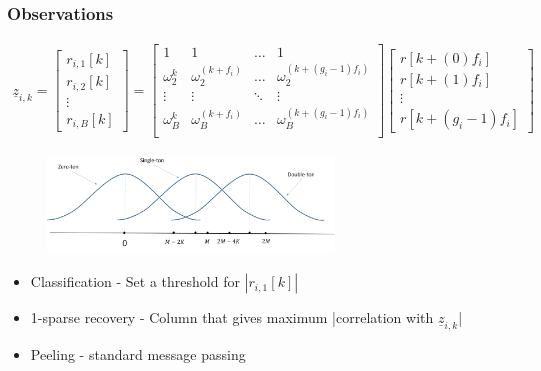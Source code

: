 \documentclass[10pt,xcolor=table]{beamer}
\newcommand{\zv}{\underline{z}}
\begin{document}
\begin{frame}\frametitle{Observations}
\begin{align} \nonumber
	    		\zv_{i,k} = \begin{bmatrix}
	    		r_{i,1}[k]\\
	    		r_{i,2}[k]\\
	    		\vdots\\
	    		r_{i,B}[k]
	    		\end{bmatrix}			
            = \begin{bmatrix}
			1 & 1 & \ldots & 1 \\
			\omega^{k}_{2} & \omega^{(k+f_i)}_{2} & \ldots & \omega^{(k+(g_i-1)f_i)}_{2}   \\
			\vdots & \vdots & \ddots & \vdots\\
			\omega^{k}_{B} & \omega^{(k+f_i)}_{B} & \ldots & \omega^{(k+(g_i-1)f_i)}_{B} \\
			\end{bmatrix}
			\begin{bmatrix}
			r[k+(0)f_i] \\
			r[k+(1)f_i] \\
			\vdots\\
			r[k+(g_i-1)f_i]
			\end{bmatrix}
			\end{align}

			\begin{figure}[t]
			\begin{center}
				\includegraphics[width=3.0in]{bin_statistics.pdf}
			\end{center}
		\end{figure}
\begin{itemize}
  \item Classification - Set a threshold for $|r_{i,1}[k]|$
  \item 1-sparse recovery - Column that gives maximum |correlation with $\zv_{i,k}$|
  \item Peeling - standard message passing
\end{itemize}
\end{frame}
\end{document}
